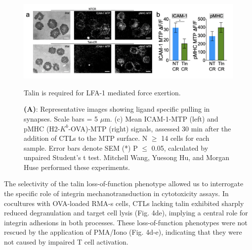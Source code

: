 \begin{figure}[htbp]
	\centering
	\includegraphics[width=1.0\columnwidth]{../figures/chapter3/fig4mtp.png}
	\caption{Talin is required for LFA-1 mediated force exertion.}
	\caption*{\textbf{(A)}: Representative images showing ligand specific pulling in synapses. Scale bars = 5 $\mu$m. (c) Mean ICAM-1-MTP (left) and pMHC (H2-$K^{b}$-OVA)-MTP (right) signals, assessed 30 min after the addition of CTLs to the MTP surface. N $\geq$ 14 cells for each sample.  Error bars denote SEM (*) P $\leq$ 0.05, calculated by unpaired Student’s t test. Mitchell Wang, Yuesong Hu, and Morgan Huse performed these experiments.}
	\label{fig:fig4mtp}
\end{figure} 

The selectivity of the talin loss-of-function phenotype allowed us to interrogate the specific role of integrin mechanotransduction in cytotoxicity assays. In cocultures with OVA-loaded RMA-s cells, CTLs lacking talin exhibited sharply reduced degranulation and target cell lysis (Fig. 4de), implying a central role for integrin adhesions in both processes. These loss-of-function phenotypes were not rescued by the application of PMA/Iono (Fig. 4d-e), indicating that they were not caused by impaired T cell activation. 

